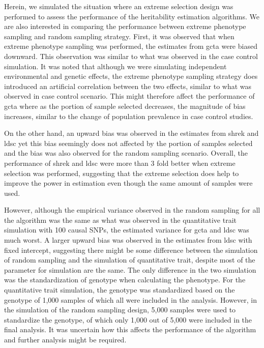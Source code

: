 	Herein, we simulated the situation where an extreme selection design was performed to assess the performance of the heritability estimation algorithms.
	We are also interested in comparing the performance between extreme phenotype sampling and random sampling strategy.
	First, it was observed that when extreme phenotype sampling was performed, the estimates from \gls{gcta} were biased downward. 
	This observation was similar to what was observed in the case control simulation.
	It was noted that although we were simulating independent environmental and genetic effects, the extreme phenotype sampling strategy does introduced an artificial correlation between the two effects, similar to what was observed in case control scenario.
	This might therefore affect the performance of \gls{gcta} where as the portion of sample selected decreases, the magnitude of bias increases, similar to the change of population prevalence in case control studies. 
	
	On the other hand, an upward bias was observed in the estimates from \gls{shrek} and \gls{ldsc} yet this bias seemingly does not affected by the portion of samples selected and the bias was also observed for the random sampling scenario.
	Overall, the performance of \gls{shrek} and \gls{ldsc} were more than 3 fold better when extreme selection was performed, suggesting that the extreme selection does help to improve the power in estimation even though the same amount of samples were used.
	
	However, although the empirical variance observed in the random sampling for all the algorithm was the same as what was observed in the quantitative trait simulation with 100 causal \glspl{SNP}, the estimated variance for \gls{gcta} and \gls{ldsc} was much worst.
	A larger upward bias was observed in the estimates from \gls{ldsc} with fixed intercept, suggesting there might be some difference between the simulation of random sampling and the simulation of quantitative trait, despite most of the parameter for simulation are the same.
	The only difference in the two simulation was the standardization of genotype when calculating the phenotype.
	For the quantitative trait simulation, the genotype was standardized based on the genotype of 1,000 samples of which all were included in the analysis. 
	However, in the simulation of the random sampling design, 5,000 samples were used to standardize the genotype, of which only 1,000 out of 5,000 were included in the final analysis.
	It was uncertain how this affects the performance of the algorithm and further analysis might be required.
	

